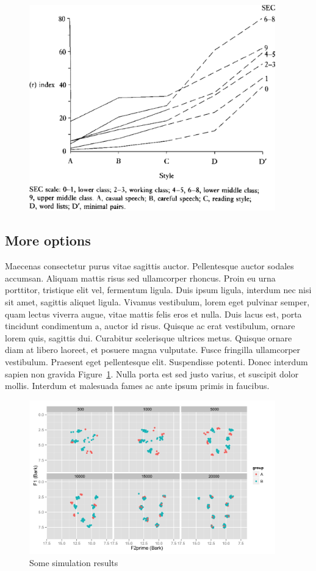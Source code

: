 \documentclass[10pt]{article}
\begin{document}
\begin{figure}[h]
\includegraphics[width=0.95\textwidth]{LabovGraph.pdf}
\end{figure}

\subsection{More options}

Maecenas consectetur purus vitae sagittis auctor. Pellentesque auctor sodales accumsan. Aliquam mattis risus sed ullamcorper rhoncus. Proin eu urna porttitor, tristique elit vel, fermentum ligula. Duis ipsum ligula, interdum nec nisi sit amet, sagittis aliquet ligula. Vivamus vestibulum, lorem eget pulvinar semper, quam lectus viverra augue, vitae mattis felis eros et nulla. Duis lacus est, porta tincidunt condimentum a, auctor id risus. Quisque ac erat vestibulum, ornare lorem quis, sagittis dui. Curabitur scelerisque ultrices metus. Quisque ornare diam at libero laoreet, et posuere magna vulputate. Fusce fringilla ullamcorper vestibulum. Praesent eget pellentesque elit. Suspendisse potenti. Donec interdum sapien non gravida 
Figure~\ref{fig:simulation}. Nulla porta est sed justo varius, et suscipit dolor mollis. Interdum et malesuada fames ac ante ipsum primis in faucibus.

\begin{figure}[H]
\centering
    \includegraphics[width=0.95\textwidth]{VowelSpace.png}
  \caption{Some simulation results}
  \label{fig:simulation}
\end{figure}
\end{document}
